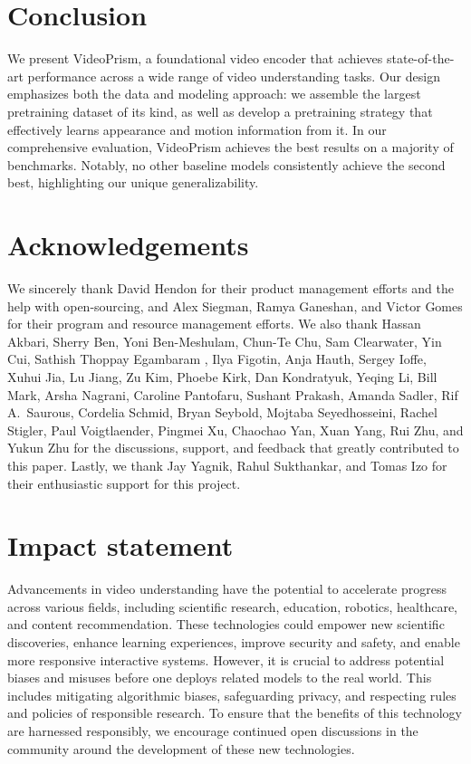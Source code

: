 \documentclass{article}
\theoremstyle{plain}
\theoremstyle{definition}
\theoremstyle{remark}
\newcommand{\OURS}{VideoPrism\xspace}
\begin{document}
%
 \section{Conclusion}

We present \OURS, a foundational video encoder that achieves state-of-the-art performance across a wide range of video understanding tasks.
Our design emphasizes both the data and modeling approach: we assemble the largest pretraining dataset of its kind, as well as develop a pretraining strategy that effectively learns appearance and motion information from it. In our comprehensive evaluation, \OURS achieves the best results on a majority of benchmarks. 
Notably, no other baseline models consistently achieve the second best, highlighting our unique generalizability. 







\section*{Acknowledgements}

We sincerely thank David Hendon for their product management efforts and the help with open-sourcing, and Alex Siegman, Ramya Ganeshan, and Victor Gomes for their program and resource management efforts. We also thank Hassan Akbari, Sherry Ben, Yoni Ben-Meshulam, Chun-Te Chu, Sam Clearwater, Yin Cui, Sathish Thoppay Egambaram
, Ilya Figotin, Anja Hauth, Sergey Ioffe, Xuhui Jia, Lu Jiang, Zu Kim, Phoebe Kirk, Dan Kondratyuk, Yeqing Li, Bill Mark, Arsha Nagrani, Caroline Pantofaru, Sushant Prakash, Amanda Sadler, Rif A.\ Saurous, Cordelia Schmid, Bryan Seybold, Mojtaba Seyedhosseini, Rachel Stigler, Paul Voigtlaender, Pingmei Xu, Chaochao Yan, Xuan Yang, Rui Zhu, and Yukun Zhu for the discussions, support, and feedback that greatly contributed to this paper. Lastly, we thank Jay Yagnik, Rahul Sukthankar, and Tomas Izo for their enthusiastic support for this project.

\section*{Impact statement}

Advancements in video understanding have the potential to accelerate progress across various fields, including scientific research, education, robotics, healthcare, and content recommendation. 
These technologies could empower new scientific discoveries, enhance learning experiences, improve security and safety, and enable more responsive interactive systems.
However, it is crucial to address potential biases and misuses before one deploys related models to the real world.
This includes mitigating algorithmic biases, safeguarding privacy, and respecting rules and policies of responsible research. To ensure that the benefits of this technology are harnessed responsibly, we encourage continued open discussions in the community around the development of these new technologies.
\end{document}
